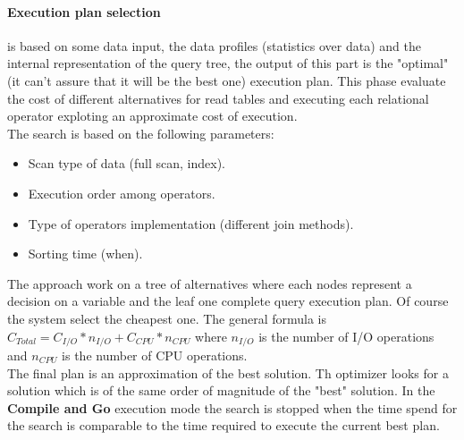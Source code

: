 \documentclass[12pt]{article}
\begin{document}
\paragraph{Execution plan selection} is based on some data input, the data profiles (statistics over data) and the internal representation of the query tree, the output of this part is the "optimal" (it can't assure that it will be the best one) execution plan. This phase evaluate the cost of different alternatives for read tables and executing each relational operator exploting an approximate cost of execution.\\
The search is based on the following parameters:
\begin{itemize}
  \item Scan type of data (full scan, index).
  \item Execution order among operators.
  \item Type of operators implementation (different join methods).
  \item Sorting time (when).
\end{itemize}
The approach work on a tree of alternatives where each nodes represent a decision on a variable and the leaf one complete query execution plan. Of course the system select the cheapest one. The general formula is $C_{Total} = C_{I/O}*n_{I/O} + C_{CPU}*n_{CPU}$ where $n_{I/O}$ is the number of I/O operations and $n_{CPU}$ is the number of CPU operations.\\
The final plan is an approximation of the best solution. Th optimizer looks for a solution which is of the same order of magnitude of the "best" solution. In the \textbf{Compile and Go} execution mode the search is stopped when the time spend for the search is comparable to the time required to execute the current best plan. %
\end{document}
